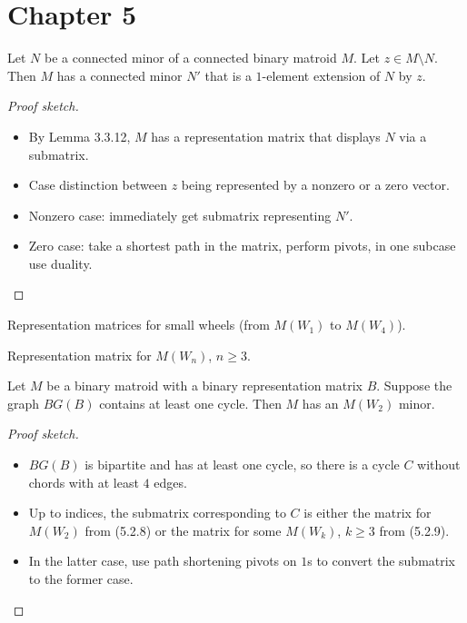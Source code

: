\section{Chapter 5}

\begin{lemma}[5.2.4]
  \label{lem:5.2.4}
  Let $N$ be a connected minor of a connected binary matroid $M$. Let $z \in M \setminus N$. Then $M$ has a connected minor $N'$ that is a $1$-element extension of $N$ by $z$.
\end{lemma}

\begin{proof}[Proof sketch]
  \begin{itemize}
    \item By Lemma 3.3.12, $M$ has a representation matrix that displays $N$ via a submatrix.
    \item Case distinction between $z$ being represented by a nonzero or a zero vector.
    \item Nonzero case: immediately get submatrix representing $N'$.
    \item Zero case: take a shortest path in the matrix, perform pivots, in one subcase use duality.
  \end{itemize}
\end{proof}

\begin{proposition}[5.2.8]
  \label{prop:5.2.8}
  Representation matrices for small wheels (from $M(W_{1})$ to $M(W_{4})$).
\end{proposition}

\begin{proposition}[5.2.9]
  \label{prop:5.2.9}
  Representation matrix for $M(W_{n})$, $n \geq 3$.
\end{proposition}

\begin{lemma}[5.2.10]
  \label{lem:5.2.10}
  Let $M$ be a binary matroid with a binary representation matrix $B$. Suppose the graph $BG(B)$ contains at least one cycle. Then $M$ has an $M(W_{2})$ minor.
\end{lemma}

\begin{proof}[Proof sketch]
  \begin{itemize}
    \item $BG(B)$ is bipartite and has at least one cycle, so there is a cycle $C$ without chords with at least $4$ edges.
    \item Up to indices, the submatrix corresponding to $C$ is either the matrix for $M(W_{2})$ from (5.2.8) or the matrix for some $M(W_{k})$, $k \geq 3$ from (5.2.9).
    \item In the latter case, use path shortening pivots on $1$s to convert the submatrix to the former case.
  \end{itemize}
\end{proof}

